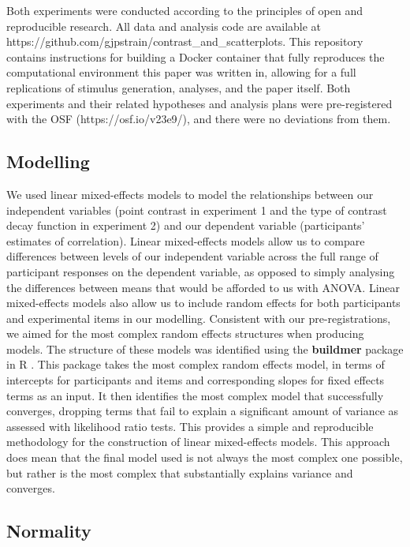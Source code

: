 \documentclass[preprint, 3p,
authoryear]{elsarticle} %
\begin{document}
Both experiments were conducted according to the principles of open and
reproducible research. All data and analysis code are available at
https://github.com/gjpstrain/contrast\_and\_scatterplots. This
repository contains instructions for building a Docker container that
fully reproduces the computational environment this paper was written
in, allowing for a full replications of stimulus generation, analyses,
and the paper itself. Both experiments and their related hypotheses and
analysis plans were pre-registered with the OSF (https://osf.io/v23e9/),
and there were no deviations from them.

\hypertarget{modelling}{%
\subsection{Modelling}\label{modelling}}

We used linear mixed-effects models to model the relationships between
our independent variables (point contrast in experiment 1 and the type
of contrast decay function in experiment 2) and our dependent variable
(participants' estimates of correlation). Linear mixed-effects models
allow us to compare differences between levels of our independent
variable across the full range of participant responses on the dependent
variable, as opposed to simply analysing the differences between means
that would be afforded to us with ANOVA. Linear mixed-effects models
also allow us to include random effects for both participants and
experimental items in our modelling. Consistent with our
pre-registrations, we aimed for the most complex random effects
structures when producing models. The structure of these models was
identified using the \textbf{buildmer} package in R
\citep{voeten_buildmer_2022}. This package takes the most complex random
effects model, in terms of intercepts for participants and items and
corresponding slopes for fixed effects terms as an input. It then
identifies the most complex model that successfully converges, dropping
terms that fail to explain a significant amount of variance as assessed
with likelihood ratio tests. This provides a simple and reproducible
methodology for the construction of linear mixed-effects models. This
approach does mean that the final model used is not always the most
complex one possible, but rather is the most complex that substantially
explains variance and converges.

\hypertarget{normality}{%
\subsection{Normality}\label{normality}}
\end{document}
